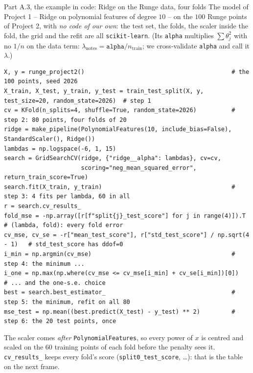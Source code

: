 \documentclass[10pt,aspectratio=169]{beamer}
\begin{document}
\begin{frame}[fragile]{Part A.3, the example in code: Ridge on the Runge data, four folds}
\footnotesize
The model of Project 1 -- Ridge on polynomial features of degree $10$ -- on the
$100$ Runge points of Project 2, with \emph{no code of our own}: the test
set, the folds, the scaler inside the fold, the grid and the refit are all
\texttt{scikit-learn}.  (Its \texttt{alpha} multiplies $\sum\theta_j^2$ with
no $1/n$ on the data term: $\lambda_{\text{notes}}=\texttt{alpha}/n_{\text{train}}$;
we cross-validate \texttt{alpha} and call it $\lambda$.)
\begin{lstlisting}[basicstyle=\ttfamily\fontsize{6.6}{7.2}\selectfont]
X, y = runge_project2()                                          # the 100 points, seed 2026
X_train, X_test, y_train, y_test = train_test_split(X, y, test_size=20, random_state=2026)  # step 1
cv = KFold(n_splits=4, shuffle=True, random_state=2026)          # step 2: 80 points, four folds of 20
ridge = make_pipeline(PolynomialFeatures(10, include_bias=False), StandardScaler(), Ridge())
lambdas = np.logspace(-6, 1, 15)
search = GridSearchCV(ridge, {"ridge__alpha": lambdas}, cv=cv,
                      scoring="neg_mean_squared_error", return_train_score=True)
search.fit(X_train, y_train)                                     # step 3: 4 fits per lambda, 60 in all
r = search.cv_results_
fold_mse = -np.array([r[f"split{j}_test_score"] for j in range(4)]).T   # (lambda, fold): every fold error
cv_mse, cv_se = -r["mean_test_score"], r["std_test_score"] / np.sqrt(4 - 1)   # std_test_score has ddof=0
i_min = np.argmin(cv_mse)                                        # step 4: the minimum ...
i_one = np.max(np.where(cv_mse <= cv_mse[i_min] + cv_se[i_min])[0])   # ... and the one-s.e. choice
best = search.best_estimator_                                    # step 5: the minimum, refit on all 80
mse_test = np.mean((best.predict(X_test) - y_test) ** 2)         # step 6: the 20 test points, once
\end{lstlisting}
The scaler comes \emph{after} \texttt{PolynomialFeatures}, so every power of
$x$ is centred and scaled on the $60$ training points of each fold before
the penalty sees it.  \texttt{cv\_results\_} keeps every fold's score
(\texttt{split0\_test\_score}, \dots): that is the table on the next frame.
\end{frame}
\end{document}
